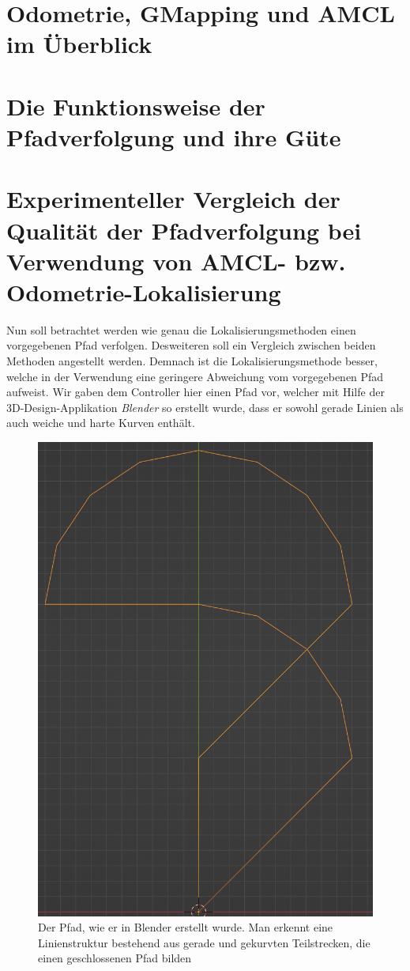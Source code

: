 \documentclass[11pt,a4paper]{article}
\begin{document}
\section{Odometrie, GMapping und AMCL im Überblick}
\section{Die Funktionsweise der Pfadverfolgung und ihre Güte}

\section{Experimenteller Vergleich der Qualität der Pfadverfolgung bei Verwendung von AMCL-  bzw. Odometrie-Lokalisierung}
Nun soll betrachtet werden wie genau die Lokalisierungsmethoden einen vorgegebenen Pfad verfolgen. Desweiteren soll ein Vergleich zwischen beiden Methoden angestellt werden. 
Demnach ist die Lokalisierungsmethode besser, welche in der Verwendung eine geringere Abweichung vom vorgegebenen Pfad aufweist. 
Wir gaben dem Controller hier einen Pfad vor, welcher mit Hilfe der 3D-Design-Applikation \textit{Blender} so erstellt wurde, dass er sowohl
gerade Linien als auch weiche und harte Kurven enthält.

\begin{figure}[h]
\centering
\includegraphics[scale = 0.6]{pfadgrafik.png}
\caption{Der Pfad, wie er in Blender erstellt wurde. Man erkennt eine Linienstruktur bestehend aus gerade und gekurvten Teilstrecken, die einen geschlossenen Pfad bilden}
\label{fig: MessungExperiment}
\end{figure}
\end{document}
